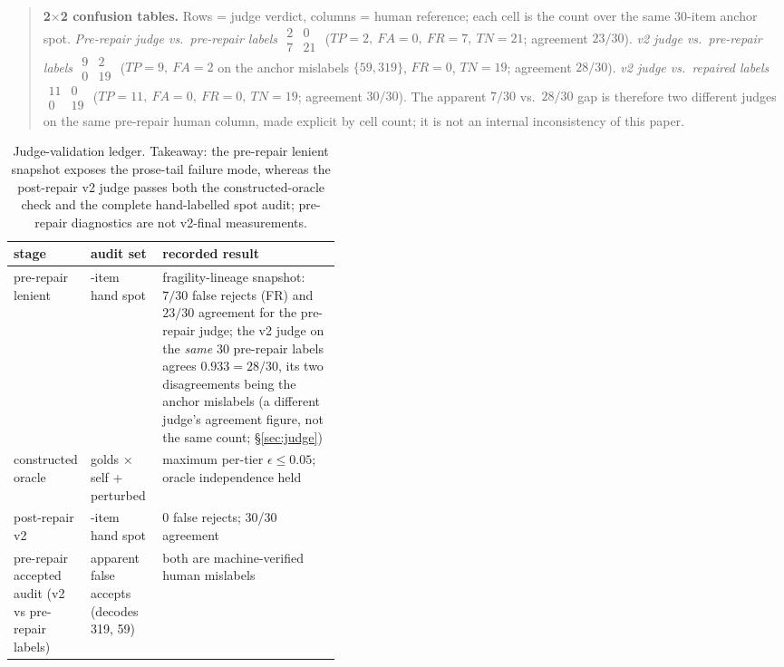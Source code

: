 \documentclass{article}
\begin{document}
\begin{quote}\small\raggedright
\textbf{2$\times$2 confusion tables.} Rows = judge verdict, columns = human
reference; each cell is the count over the same $30$-item anchor spot.
\textit{Pre-repair judge vs.\ pre-repair labels}
$\begin{smallmatrix}2&0\\7&21\end{smallmatrix}$ ($TP{=}2,\ FA{=}0,\ FR{=}7,\
TN{=}21$; agreement $23/30$).
\textit{v2 judge vs.\ pre-repair labels}
$\begin{smallmatrix}9&2\\0&19\end{smallmatrix}$ ($TP{=}9,\ FA{=}2$ on the anchor
mislabels $\{59,319\}$, $FR{=}0$, $TN{=}19$; agreement $28/30$).
\textit{v2 judge vs.\ repaired labels}
$\begin{smallmatrix}11&0\\0&19\end{smallmatrix}$ ($TP{=}11,\ FA{=}0,\ FR{=}0,\
TN{=}19$; agreement $30/30$).
The apparent $7/30$ vs.\ $28/30$ gap is therefore two different judges on the same
pre-repair human column, made explicit by cell count; it is not an internal
inconsistency of this paper.
\end{quote}

\begin{table}[h!]
\centering
\caption{Judge-validation ledger.  Takeaway: the pre-repair lenient snapshot exposes
the prose-tail failure mode, whereas the post-repair v2 judge passes both the
constructed-oracle check and the complete hand-labelled spot audit; pre-repair
diagnostics are not v2-final measurements.}
\label{tab:judge-validation}
\begin{tabularx}{\linewidth}{@{}>{\raggedright\arraybackslash}p{0.20\linewidth}>{\raggedright\arraybackslash}p{0.22\linewidth}X@{}}
\toprule
stage & audit set & recorded result \\
\midrule
pre-repair lenient & 30-item hand spot & fragility-lineage snapshot: $7/30$ false rejects (FR) and $23/30$ agreement for the pre-repair judge; the v2 judge on the \emph{same} 30 pre-repair labels agrees $0.933=28/30$, its two disagreements being the anchor mislabels (a different judge's agreement figure, not the same count; \S\ref{sec:judge}) \\
constructed oracle & 500 golds $\times$ self + perturbed & maximum per-tier $\epsilon\le0.05$; oracle independence held \\
post-repair v2 & 30-item hand spot & 0 false rejects; 30/30 agreement \\
\addlinespace
pre-repair accepted audit (v2 vs pre-repair labels) & 2 apparent false accepts (decodes 319, 59) & both are machine-verified human mislabels \\
\bottomrule
\end{tabularx}
\end{table}
\end{document}
